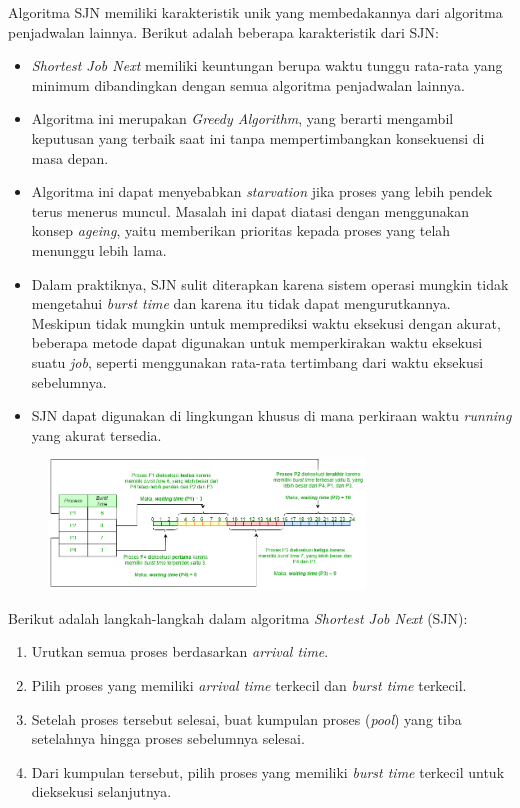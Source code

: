 \documentclass[12pt]{article}
\begin{document}
    Algoritma SJN memiliki karakteristik unik yang membedakannya dari algoritma penjadwalan lainnya. Berikut adalah beberapa karakteristik dari SJN:
    \begin{itemize}
        \item \textit{Shortest Job Next} memiliki keuntungan berupa waktu tunggu rata-rata yang minimum dibandingkan dengan semua algoritma penjadwalan lainnya.
        \item Algoritma ini merupakan \textit{Greedy Algorithm}, yang berarti mengambil keputusan yang terbaik saat ini tanpa mempertimbangkan konsekuensi di masa depan.
        \item Algoritma ini dapat menyebabkan \textit{starvation} jika proses yang lebih pendek terus menerus muncul. Masalah ini dapat diatasi dengan menggunakan konsep \textit{ageing}, yaitu memberikan prioritas kepada proses yang telah menunggu lebih lama.
        \item Dalam praktiknya, SJN sulit diterapkan karena sistem operasi mungkin tidak mengetahui \textit{burst time} dan karena itu tidak dapat mengurutkannya. Meskipun tidak mungkin untuk memprediksi waktu eksekusi dengan akurat, beberapa metode dapat digunakan untuk memperkirakan waktu eksekusi suatu \textit{job}, seperti menggunakan rata-rata tertimbang dari waktu eksekusi sebelumnya.
        \item SJN dapat digunakan di lingkungan khusus di mana perkiraan waktu \textit{running} yang akurat tersedia.
    \end{itemize}
    \begin{figure}[h]
    \centering
    \includegraphics[width=0.75\textwidth]{assets/SJN 2.2.png}
    \label{fig:diagram}
    \end{figure}
    Berikut adalah langkah-langkah dalam algoritma \textit{Shortest Job Next} (SJN):
    \begin{enumerate} 
        \item Urutkan semua proses berdasarkan \textit{arrival time}.
        \item Pilih proses yang memiliki \textit{arrival time} terkecil dan \textit{burst time} terkecil.
        \item Setelah proses tersebut selesai, buat kumpulan proses (\textit{pool}) yang tiba setelahnya hingga proses sebelumnya selesai.
        \item Dari kumpulan tersebut, pilih proses yang memiliki \textit{burst time} terkecil untuk dieksekusi selanjutnya.
    \end{enumerate}
\end{document}
